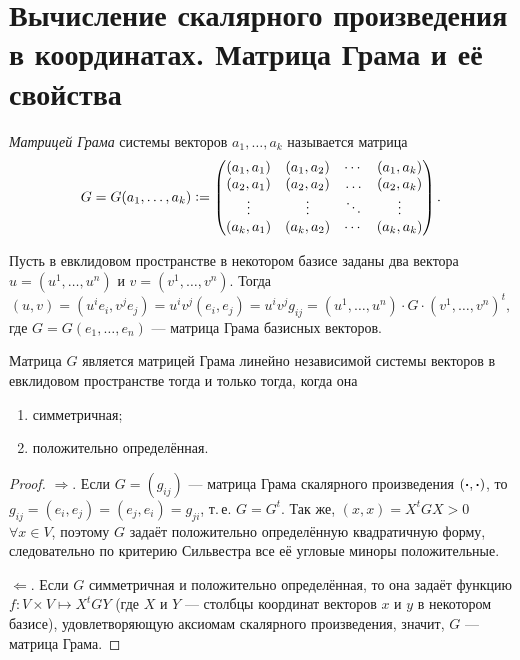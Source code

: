 \section{Вычисление скалярного произведения в координатах. Матрица Грама и её свойства}

\begin{definition}
    \textit{Матрицей Грама} системы векторов $a_1, \ldots, a_k$ называется матрица
    \[
        G = G(a_1, \ldots, a_k) \vcentcolon =
        \begin{pmatrix}
            (a_1, a_1) & (a_1, a_2) & \cdots & (a_1, a_k)\\
            (a_2, a_1) & (a_2, a_2) & \ldots & (a_2, a_k)\\
            \vdots & \vdots & \ddots & \vdots\\
            (a_k, a_1) & (a_k, a_2) & \cdots & (a_k, a_k)
        \end{pmatrix}.
    \]
\end{definition}

Пусть в евклидовом пространстве в некотором базисе заданы два вектора $u = (u^1, \ldots, u^n)$ и $v = (v^1, \ldots, v^n)$. Тогда
\[
    (u, v) = (u^ie_i, v^je_j) = u^iv^j(e_i, e_j) = u^iv^jg_{ij} = (u^1, \ldots, u^n) \cdot G \cdot (v^1, \ldots, v^n)^t,
\]
где $G = G(e_1, \ldots, e_n)$ --- матрица Грама базисных векторов.

\begin{theorem}
    Матрица $G$ является матрицей Грама линейно независимой системы векторов в евклидовом пространстве тогда и только тогда, когда она
    \begin{enumerate}[nolistsep]
        \item симметричная;
        \item положительно определённая.
    \end{enumerate}
\end{theorem}

\begin{proof}
    $\Rightarrow$. Если $G = (g_{ij})$ --- матрица Грама скалярного произведения $(\boldsymbol{\cdot}, \boldsymbol{\cdot})$, то $g_{ij} = (e_i, e_j) = (e_j, e_i) = g_{ji}$, т.\,е. $G = G^t$. Так же, $(x, x) = X^tGX > 0$ $\forall x \in V$, поэтому $G$ задаёт положительно определённую квадратичную форму, следовательно по критерию Сильвестра все её угловые миноры положительные.

    $\Leftarrow$. Если $G$ симметричная и положительно определённая, то она задаёт функцию $f: V \times V \mapsto X^tGY$ (где $X$ и $Y$ --- столбцы координат векторов $x$ и $y$ в некотором базисе), удовлетворяющую аксиомам скалярного произведения, значит, $G$ --- матрица Грама.
\end{proof}

